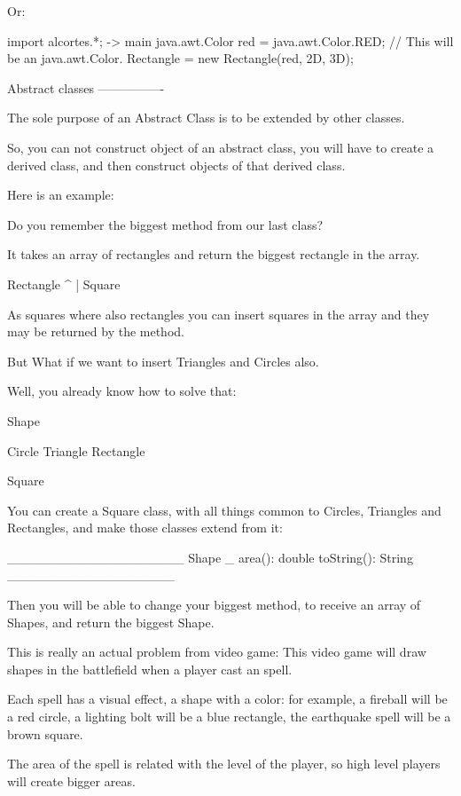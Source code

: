 \documentclass[a4paper, 9pt]{extarticle}
\begin{document}
\begin{blackboard}
Or:

import alcortes.*;
-> main
java.awt.Color red = java.awt.Color.RED; // This will be an java.awt.Color.
Rectangle = new Rectangle(red, 2D, 3D);







Abstract classes
----------------

The sole purpose of an Abstract Class is to be extended by other classes.

So, you can not construct object of an abstract class, you will have to
create a derived class, and then construct objects of that derived class.

Here is an example:

Do you remember the biggest method from our last class?

It takes an array of rectangles and return the biggest rectangle in the array.

Rectangle
   ^
   |
 Square

As squares where also rectangles you can insert squares in the array and they
may be returned by the method.

But What if we want to insert Triangles and Circles also.

Well, you already know how to solve that:

       Shape

Circle  Triangle    Rectangle

                    Square

You can create a Square class, with all things common to Circles, Triangles
and Rectangles, and make those classes extend from it:

___________________
Shape
_
area(): double
toString(): String
__________________

Then you will be able to change your biggest method, to receive an array of
Shapes, and return the biggest Shape.

This is really an actual problem from video game: This video game will draw
shapes in the battlefield when a player cast an spell.

Each spell has a visual effect, a shape with a color: for example, a fireball
will be a red circle, a lighting bolt will be a blue rectangle, the
earthquake spell will be a brown square.

The area of the spell is related with the level of the player, so high level
players will create bigger areas.


\end{blackboard}
\end{document}
